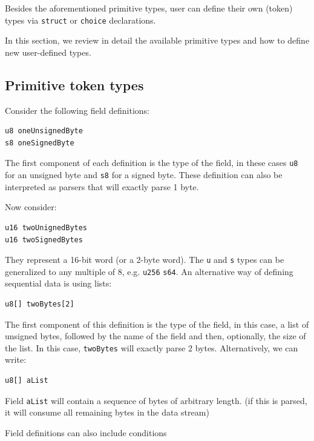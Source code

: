 \documentclass[10pt,oneside]{article}
\begin{document}
Besides the aforementioned primitive types, user can define their own
(token) types via \texttt{struct} or \texttt{choice} declarations.

In this section, we review in detail the available primitive types and
how to define new user-defined types.

\hypertarget{primitive-token-types}{%
\subsection{Primitive token types}\label{primitive-token-types}}

Consider the following field definitions:

\begin{verbatim}
u8 oneUnsignedByte
s8 oneSignedByte
\end{verbatim}

The first component of each definition is the type of the field, in
these cases \texttt{u8} for an unsigned byte and \texttt{s8} for a
signed byte. These definition can also be interpreted as parsers that
will exactly parse 1 byte.

Now consider:

\begin{verbatim}
u16 twoUnignedBytes
u16 twoSignedBytes
\end{verbatim}

They represent a 16-bit word (or a 2-byte word). The \texttt{u} and
\texttt{s} types can be generalized to any multiple of 8, e.g.
\texttt{u256} \texttt{s64}. An alternative way of defining sequential
data is using lists:

\begin{verbatim}
u8[] twoBytes[2]
\end{verbatim}

The first component of this definition is the type of the field, in this
case, a list of unsigned bytes, followed by the name of the field and
then, optionally, the size of the list. In this case, \texttt{twoBytes}
will exactly parse 2 bytes. Alternatively, we can write:

\begin{verbatim}
u8[] aList
\end{verbatim}

Field \texttt{aList} will contain a sequence of bytes of arbitrary
length. (if this is parsed, it will consume all remaining bytes in the
data stream)

Field definitions can also include conditions
\end{document}
